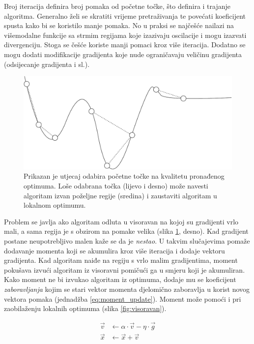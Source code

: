 \documentclass[times, utf8, numeric, diplomski]{fer}
\def\figref#1{(slika \ref{#1})}
\begin{document}
Broj iteracija definira broj pomaka od početne točke, što definira i trajanje algoritma. Generalno želi se skratiti vrijeme pretraživanja te povećati koeficijent spusta kako bi se koristilo manje pomaka. No u praksi se najčešće nailazi na višemodalne funkcije sa strmim regijama koje izazivaju oscilacije i mogu izazvati divergenciju. Stoga se češće koriste manji pomaci kroz više iteracija. Dodatno se mogu dodati modifikacije gradijenta koje nude ograničavaju veličinu gradijenta (odsijecanje gradijenta i sl.).

\begin{figure}[H]
\centering
\includegraphics[scale=0.5]{grad_descent_start.pdf}
\caption{Prikazan je utjecaj odabira početne točke na kvalitetu pronađenog optimuma. Loše odabrana točka (lijevo i desno) može navesti algoritam izvan poželjne regije (sredina) i zaustaviti algoritam u lokalnom optimumu.}
\label{fig:pocetna_tocka}
\end{figure}

Problem se javlja ako algoritam odluta u visoravan na kojoj su gradijenti vrlo mali, a sama regija je s obzirom na pomake velika (slika \ref{fig:pocetna_tocka}, desno). Kad gradijent postane neupotrebljivo malen kaže se da je \textit{nestao}. U takvim slučajevima pomaže dodavanje momenta koji se akumulira kroz više iteracija i dodaje vektoru gradijenta. Kad algoritam naiđe na regiju s vrlo malim gradijentima, moment pokušava izvući algoritam iz visoravni pomičući ga u smjeru koji je akumuliran. Kako moment ne bi izvukao algoritam iz optimuma, dodaje mu se koeficijent \textit{zaboravljanja} kojim se stari vektor momenta djelomično zaboravlja u korist novog vektora pomaka (jednadžba \ref{eq:moment_update}). Moment može pomoći i pri zaobilaženju lokalnih optimuma \figref{fig:visoravan}.

\begin{equation}
\label{eq:moment_update}
\begin{split}
\vec{v} &\gets \alpha \cdot \vec{v} - \eta \cdot \vec{g} \\
\vec{x} &\gets \vec{x} + \vec{v}
\end{split}
\end{equation}
\end{document}
